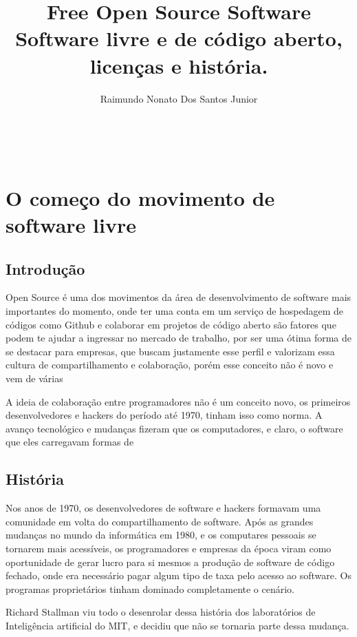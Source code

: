 \documentclass[12pt, a4paper]{report}
\title{Free Open Source Software\\\LARGE\vspace{0.5em} Software livre e de código aberto, licenças e história.}
\author{Raimundo Nonato Dos Santos Junior}
\renewcommand{\maketitle}{
  \begin{center}

  \vspace*{\fill}
  {\huge\bfseries\thetitle}\\
  \vspace{1.2em}
  {\large\bfseries\theauthor}
  \vspace*{\fill}
  \end{center}

  \newpage
}
\begin{document}

\maketitle

\tableofcontents

\chapter{O começo do movimento de software livre}

\section{Introdução}


Open Source é uma dos movimentos da área de desenvolvimento de software mais importantes do momento, onde ter uma conta em um serviço de hospedagem de códigos como Github e colaborar em projetos de código aberto são fatores que podem te ajudar a ingressar no mercado de trabalho, por ser uma ótima forma de se destacar para empresas, que buscam justamente esse perfil e valorizam essa cultura de compartilhamento e colaboração, porém esse conceito não é novo e vem de várias

A ideia de colaboração entre programadores não é um conceito novo, os primeiros desenvolvedores e hackers do período até 1970, tinham isso como norma.
A avanço tecnológico e mudanças fizeram que os computadores, e claro, o software que eles carregavam formas de 

\section{História}

Nos anos de 1970, os desenvolvedores de software e hackers formavam uma comunidade em volta do compartilhamento de software. Após as grandes mudanças no mundo da informática em 1980, e os computares pessoais se tornarem mais acessíveis, os programadores e empresas da época viram como oportunidade de gerar lucro para si mesmos a produção de software de código fechado, onde era necessário pagar algum tipo de taxa pelo acesso ao software. Os programas proprietários tinham dominado completamente o cenário.

Richard Stallman viu todo o desenrolar dessa história dos laboratórios de Inteligência artificial do MIT, e decidiu que não se tornaria parte dessa mudança. 
\end{document}
